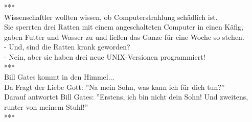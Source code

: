 ***\\


Wissenschaftler wollten wissen, ob Computerstrahlung schädlich ist.\\
Sie sperrten drei Ratten mit einem angeschalteten Computer in einen Käfig, gaben Futter und Wasser zu und ließen das Ganze für eine Woche so stehen.\\
\newline
- Und, sind die Ratten krank geworden?\\
- Nein, aber sie haben drei neue UNIX-Versionen programmiert!\\


***\\


Bill Gates kommt in den Himmel... \\
Da Fragt der Liebe Gott: ''Na mein Sohn, was kann ich für dich tun?'' \\
Darauf antwortet Bill Gates: ''Erstens, ich bin nicht dein Sohn! Und zweitens, runter von meinem Stuhl!''\\


***\\


